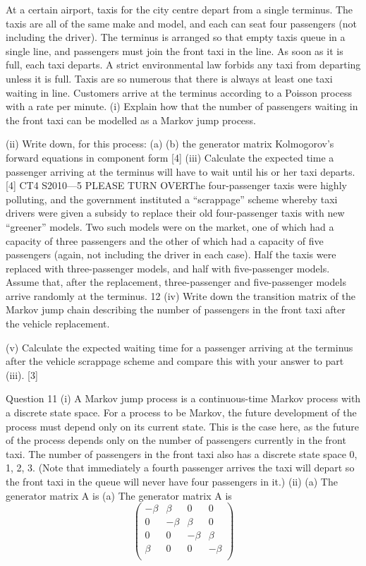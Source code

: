 \documentclass[a4paper,12pt]{article}
\begin{document}
\begin{enumerate}
[Total 11]
At a certain airport, taxis for the city centre depart from a single terminus. The taxis
are all of the same make and model, and each can seat four passengers (not including
the driver). The terminus is arranged so that empty taxis queue in a single line, and
passengers must join the front taxi in the line. As soon as it is full, each taxi departs.
A strict environmental law forbids any taxi from departing unless it is full. Taxis are
so numerous that there is always at least one taxi waiting in line.
Customers arrive at the terminus according to a Poisson process with a rate \beta per
minute.
(i) Explain how that the number of passengers waiting in the front taxi can be
modelled as a Markov jump process.

(ii) Write down, for this process:
(a)
(b)
the generator matrix
Kolmogorov’s forward equations in component form
[4]
(iii)
Calculate the expected time a passenger arriving at the terminus will have to
wait until his or her taxi departs.
[4]
CT4 S2010—5
PLEASE TURN OVERThe four-passenger taxis were highly polluting, and the government instituted a
“scrappage” scheme whereby taxi drivers were given a subsidy to replace their old
four-passenger taxis with new “greener” models. Two such models were on the
market, one of which had a capacity of three passengers and the other of which had a
capacity of five passengers (again, not including the driver in each case). Half the
taxis were replaced with three-passenger models, and half with five-passenger
models.
Assume that, after the replacement, three-passenger and five-passenger models arrive
randomly at the terminus.
12
(iv) Write down the transition matrix of the Markov jump chain describing the
number of passengers in the front taxi after the vehicle replacement.

(v) Calculate the expected waiting time for a passenger arriving at the terminus
after the vehicle scrappage scheme and compare this with your answer to part
(iii).
[3]

\newpage
Question 11
(i)
A Markov jump process is a continuous-time Markov process with a discrete state
space.
For a process to be Markov, the future development of the process must depend only
on its current state.
This is the case here, as the future of the process depends only on the number of
passengers currently in the front taxi.
The number of passengers in the front taxi also has a discrete state space {0, 1, 2, 3}.
(Note that immediately a fourth passenger arrives the taxi will depart so the front taxi
in the queue will never have four passengers in it.)
(ii)
(a)
The generator matrix A is
(a) The generator matrix A is
\[
\begin{pmatrix}
-\beta & \beta & 0 & 0 \\
0 & -\beta & \beta &  0 \\
0 &  0 & -\beta & \beta  \\
\beta & 0 &  0 & -\beta    \\
\end{pmatrix}
\]



\end{enumerate}
\end{document}
